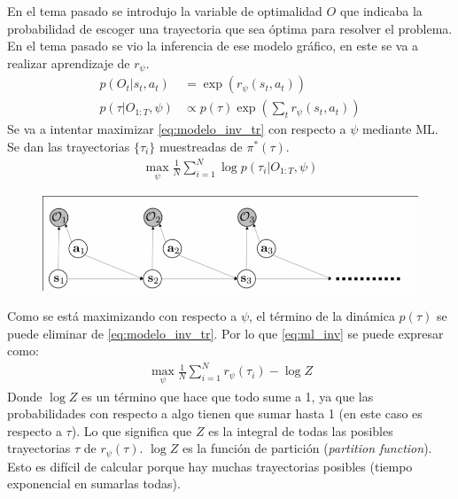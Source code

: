  En el tema pasado se introdujo la variable de optimalidad $O$ que indicaba la probabilidad de
 escoger una trayectoria que sea óptima para resolver el problema. En el tema pasado se vio
 la inferencia de ese modelo gráfico, en este se va a realizar aprendizaje de $r_\psi$.
\begin{align}
    p ( O _ { t } | s _ { t } , a _ { t } ) &= \operatorname { exp } ( r _ { \psi } ( s _ { t } ,
    a _ { t } ) )\\
    \label{eq:modelo_inv_tr}
    p ( \tau | O _ { 1 : T } , \psi ) &\propto p ( \tau ) \operatorname { exp } ( \sum _ { t } r _ { \psi } ( s _ { t } , a _ { t } ) )
\end{align}
Se va a intentar maximizar \ref{eq:modelo_inv_tr} con respecto a $\psi$ mediante ML. Se dan las trayectorias
$\{\tau_i\}$ muestreadas de $\pi^*(\tau)$.
\begin{align}
    \label{eq:ml_inv}
\operatorname { max } _ { \psi } \frac { 1 } { N } \sum _ { i = 1 } ^ { N } \operatorname { log } p ( \tau _ { i } | O _ { 1 : T } , \psi )
\end{align}
\begin{figure}[H]
	\centering
	\includegraphics[width=0.8\linewidth]{figures/2020-07-06-130523_811x205_scrot.png}
\end{figure}

Como se está maximizando con respecto a $\psi$, el término de la dinámica $p(\tau)$ se puede
eliminar de \ref{eq:modelo_inv_tr}. Por lo que \ref{eq:ml_inv} se puede expresar como:
\begin{align}
    \label{eq:inv_ml_pre}
\operatorname { max } _ { \psi } \frac { 1 } { N } \sum _ { i = 1 } ^ { N } r _ { \psi } ( \tau _ { i } ) - \operatorname { log } Z
\end{align}
Donde $\log Z$ es un término que hace que todo sume a 1, ya que las probabilidades con
respecto a algo tienen que sumar hasta 1 (en este caso es respecto a $\tau$). Lo que
significa que $Z$ es la integral de todas las posibles trayectorias $\tau$ de $r_\psi(\tau)$.
$\log Z$ es la función de partición (\textit{partition function}). Esto es difícil de calcular
porque hay muchas trayectorias posibles (tiempo exponencial en sumarlas todas).

